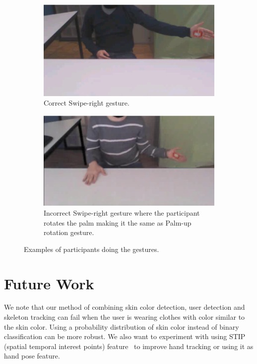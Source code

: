 \documentclass{acm_proc_article-sp}
\begin{document}
\begin{figure}
\centering
\begin{subfigure}{1\columnwidth}
\includegraphics[width=1\columnwidth]{fig/swipe-right-correct.ps}
\caption{Correct Swipe-right gesture.}
\label{fig:depth}
\end{subfigure}
\begin{subfigure}{1\columnwidth}
\includegraphics[width=1\columnwidth]{fig/swipe-right-wrong.ps}
\caption{Incorrect Swipe-right gesture where the participant rotates the palm making it
the same as Palm-up rotation gesture.}
\label{fig:hog}
\end{subfigure}
\caption{Examples of participants doing the gestures.}
\label{fig:swipe-right}
\end{figure}


\section{Future Work}
We note that our method of combining skin color detection, user detection and
skeleton tracking can fail when the user is wearing clothes with color similar
to the skin color. Using a probability distribution of skin color instead
of binary classification can be more robust. We also want to experiment with using STIP (spatial temporal
interest points) feature~\cite{laptev2003} to improve hand tracking or using it as hand pose feature.
\end{document}
